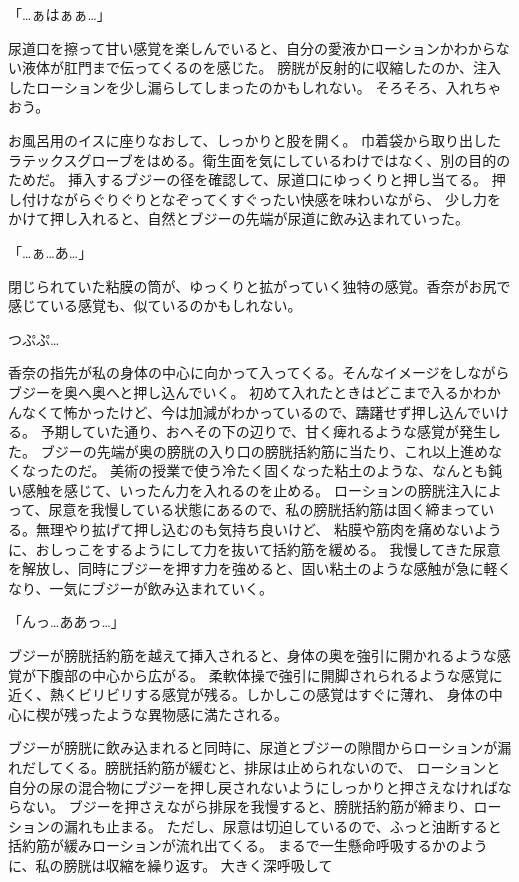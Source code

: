 「…ぁはぁぁ…」

尿道口を擦って甘い感覚を楽しんでいると、自分の愛液かローションかわからない液体が肛門まで伝ってくるのを感じた。
膀胱が反射的に収縮したのか、注入したローションを少し漏らしてしまったのかもしれない。
そろそろ、入れちゃおう。

お風呂用のイスに座りなおして、しっかりと股を開く。
巾着袋から取り出したラテックスグローブをはめる。衛生面を気にしているわけではなく、別の目的のためだ。
挿入するブジーの径を確認して、尿道口にゆっくりと押し当てる。
押し付けながらぐりぐりとなぞってくすぐったい快感を味わいながら、
少し力をかけて押し入れると、自然とブジーの先端が尿道に飲み込まれていった。

「…ぁ…あ…」

閉じられていた粘膜の筒が、ゆっくりと拡がっていく独特の感覚。香奈がお尻で感じている感覚も、似ているのかもしれない。

つぷぷ…

香奈の指先が私の身体の中心に向かって入ってくる。そんなイメージをしながらブジーを奥へ奥へと押し込んでいく。
初めて入れたときはどこまで入るかわかんなくて怖かったけど、今は加減がわかっているので、躊躇せず押し込んでいける。
予期していた通り、おへその下の辺りで、甘く痺れるような感覚が発生した。
ブジーの先端が奥の膀胱の入り口の膀胱括約筋に当たり、これ以上進めなくなったのだ。
美術の授業で使う冷たく固くなった粘土のような、なんとも鈍い感触を感じて、いったん力を入れるのを止める。
ローションの膀胱注入によって、尿意を我慢している状態にあるので、私の膀胱括約筋は固く締まっている。無理やり拡げて押し込むのも気持ち良いけど、
粘膜や筋肉を痛めないように、おしっこをするようにして力を抜いて括約筋を緩める。
我慢してきた尿意を解放し、同時にブジーを押す力を強めると、固い粘土のような感触が急に軽くなり、一気にブジーが飲み込まれていく。

「んっ…ああっ…」

ブジーが膀胱括約筋を越えて挿入されると、身体の奥を強引に開かれるような感覚が下腹部の中心から広がる。
柔軟体操で強引に開脚されられるような感覚に近く、熱くビリビリする感覚が残る。しかしこの感覚はすぐに薄れ、
身体の中心に楔が残ったような異物感に満たされる。

ブジーが膀胱に飲み込まれると同時に、尿道とブジーの隙間からローションが漏れだしてくる。膀胱括約筋が緩むと、排尿は止められないので、
ローションと自分の尿の混合物にブジーを押し戻されないようにしっかりと押さえなければならない。
ブジーを押さえながら排尿を我慢すると、膀胱括約筋が締まり、ローションの漏れも止まる。
ただし、尿意は切迫しているので、ふっと油断すると括約筋が緩みローションが流れ出てくる。
まるで一生懸命呼吸するかのように、私の膀胱は収縮を繰り返す。
大きく深呼吸して



